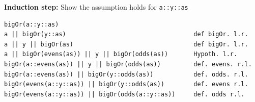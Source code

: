 \documentclass[10pt, a4paper]{article}
\begin{document}
\textbf{Induction step:} Show the assumption holds for \texttt{a::y::as}

\begin{verbatim}
bigOr(a::y::as)
a || bigOr(y::as)                                   def bigOr. l.r.
a || y || bigOr(as)                                 def bigOr. l.r.
a || bigOr(evens(as)) || y || bigOr(odds(as))       Hypoth. l.r.
bigOr(a::evens(as)) || y || bigOr(odds(as))         def. evens. r.l.
bigOr(a::evens(as)) || bigOr(y::odds(as))           def. odds. r.l.
bigOr(evens(a::y::as)) || bigOr(y::odds(as))        def. evens r.l.
bigOr(evens(a::y::as)) || bigOr(odds(a::y::as))     def. odds r.l.
\end{verbatim}
\end{document}
